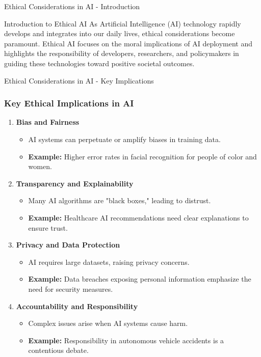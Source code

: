 \documentclass[aspectratio=169]{beamer}
\begin{document}
\begin{frame}[fragile]{Ethical Considerations in AI - Introduction}
    \begin{block}{Introduction to Ethical AI}
        As Artificial Intelligence (AI) technology rapidly develops and integrates into our daily lives, 
        ethical considerations become paramount. Ethical AI focuses on the moral implications of AI deployment 
        and highlights the responsibility of developers, researchers, and policymakers in guiding these technologies 
        toward positive societal outcomes.
    \end{block}
\end{frame}

\begin{frame}[fragile]{Ethical Considerations in AI - Key Implications}
    \frametitle{Key Ethical Implications in AI}
    \begin{enumerate}
        \item \textbf{Bias and Fairness}
            \begin{itemize}
                \item AI systems can perpetuate or amplify biases in training data.
                \item \textbf{Example:} Higher error rates in facial recognition for people of color and women.
            \end{itemize}
        
        \item \textbf{Transparency and Explainability}
            \begin{itemize}
                \item Many AI algorithms are "black boxes," leading to distrust.
                \item \textbf{Example:} Healthcare AI recommendations need clear explanations to ensure trust.
            \end{itemize}
        
        \item \textbf{Privacy and Data Protection}
            \begin{itemize}
                \item AI requires large datasets, raising privacy concerns.
                \item \textbf{Example:} Data breaches exposing personal information emphasize the need for security measures.
            \end{itemize}

        \item \textbf{Accountability and Responsibility}
            \begin{itemize}
                \item Complex issues arise when AI systems cause harm.
                \item \textbf{Example:} Responsibility in autonomous vehicle accidents is a contentious debate.
            \end{itemize}
        

\end{enumerate}
\end{frame}
\end{document}

